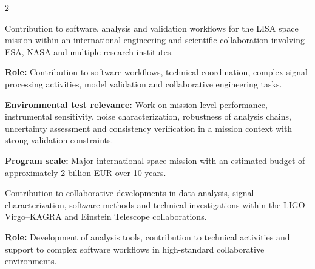 \documentclass[8pt,a4paper,ragged2e,withhyper]{altacv}
\begin{document}
\begin{paracol}{2}
\divider

\divider




\end{paracol}

\newpage



Contribution to software, analysis and validation workflows for the LISA space mission within an international engineering and scientific collaboration involving ESA, NASA and multiple research institutes.

\textbf{Role:} Contribution to software workflows, technical coordination, complex signal-processing activities, model validation and collaborative engineering tasks.

\textbf{Environmental test relevance:} Work on mission-level performance, instrumental sensitivity, noise characterization, robustness of analysis chains, uncertainty assessment and consistency verification in a mission context with strong validation constraints.

\textbf{Program scale:} Major international space mission with an estimated budget of approximately 2 billion EUR over 10 years.

\divider


Contribution to collaborative developments in data analysis, signal characterization, software methods and technical investigations within the LIGO--Virgo--KAGRA and Einstein Telescope collaborations.

\textbf{Role:} Development of analysis tools, contribution to technical activities and support to complex software workflows in high-standard collaborative environments.
\end{document}
